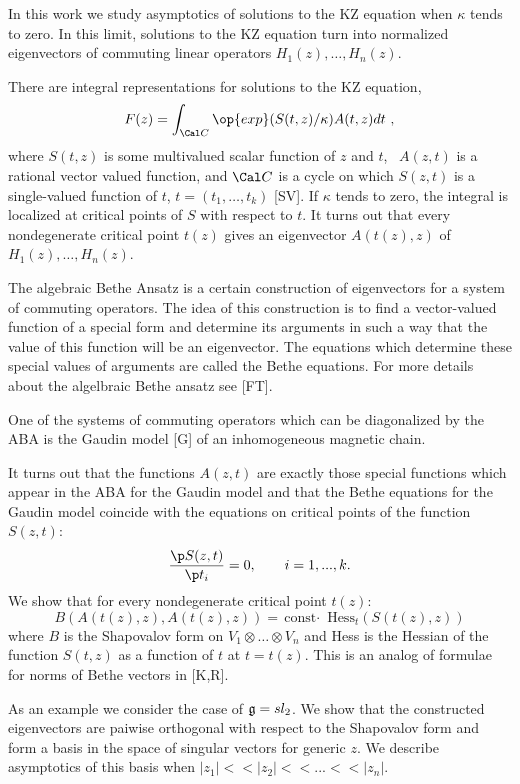 In this work we study asymptotics of solutions to the
KZ equation when $\kappa$
tends to zero. In this limit, solutions to the KZ equation turn into
normalized eigenvectors of commuting linear operators
$H_1(z),\dots ,H_n(z)$.

There are integral representations for solutions to the KZ equation,
$$
F(z) = \int_{\Cal C} {\op{exp}}(S(t,z)/ \kappa)A(t,z)dt \ ,
$$
where $S(t,z)$ is some multivalued scalar function of $z$ and $t$, \
$A(z,t)$ is a rational
vector valued function, and $\Cal C$ is a cycle
 on which $S(z,t)$ is a
single-valued function of $t$, $t=(t_1,\dots ,t_k)$ [SV]. If $\kappa$
tends to zero, the integral is localized at critical points of $S$
with respect to $t$. It turns out that every nondegenerate  critical point
$t(z)$ gives an eigenvector $A(t(z),z)$ of $H_1(z),\dots, H_n(z)$.

The algebraic Bethe Ansatz is a certain construction of eigenvectors
for a system of commuting operators. The idea of this construction is
to find a vector-valued function of a special
form and determine its arguments in such a way that the value of this
function will be an eigenvector. The equations which determine these
special values of arguments are called the Bethe equations. For more
details about the algelbraic Bethe ansatz see [FT].

One of the systems of commuting operators which can be diagonalized by
 the ABA is the Gaudin model [G] of an inhomogeneous magnetic chain.

It turns out that the functions $A(z,t)$  are exactly those
special functions which appear in the ABA for the Gaudin model and
that the Bethe equations for the Gaudin model coincide with the equations on
critical points of the function $S(z,t)$:
$$
\frac{\p S(z,t)}{\p t_i} = 0 , \qquad  i=1,...,k .
$$
We show that for every nondegenerate critical point $t(z)$:
$$
B(A(t(z),z), A(t(z),z)) = {\text{const}\cdot}
{\text{ Hess}}_t (S(t(z),z))
$$
where $B$ is the Shapovalov form on $V_1\otimes\dots\otimes V_n$ and
Hess is the Hessian of the function $S(t,z)$ as a function of $t$ at
$t=t(z)$. This is an analog of formulae for norms of Bethe vectors in
[K,R].

As an example we consider the case of  $\frak g=sl_2$. We show
that the constructed eigenvectors are paiwise orthogonal with
respect to the Shapovalov form and form a basis in the space of
singular vectors for generic $z$. We describe asymptotics of this basis when
$| z_1 | << |z_2| << ... << | z_n | .$


